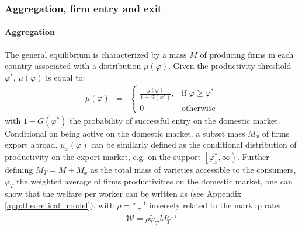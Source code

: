 \documentclass[a4paper,11pt]{article}
\begin{document}
\subsubsection{Aggregation, firm entry and exit}

\paragraph{Aggregation} The general equilibrium is characterized by a mass $M$ of producing firms in each country associated with a distribution $\mu(\varphi)$. Given the productivity threshold $\varphi^\ast$, $\mu(\varphi)$ is equal to:
\begin{eqnarray}
\mu(\varphi) &=& \left\{
\begin{array}{ll}
\frac{g(\varphi)}{1-G(\varphi^\ast)}, & \text{if } \varphi\geq \varphi^\ast  \\
0 & \text{otherwise}
\end{array}
\right.  \label{eq:muofphi}
\end{eqnarray}
\noindent with $1-G(\varphi^\ast)$ the probability of successful entry on the domestic market. Conditional on being active on the domestic market, a subset mass $M_x$ of firms export abroad. $\mu_x(\varphi)$ can be similarly defined as the conditional distribution of productivity on the export market, e.g. on the support $\left[ \varphi^\ast_x,\infty\right)$.
Further defining $M_T = M+M_x$ as the total mass of varieties accessible to the consumers, $\widetilde{\varphi}_T$ the weighted average of firms productivities on the domestic market, one can show that the welfare per worker can be written as (see Appendix \ref{app:theoretical_model}), with $\rho =  \frac{\sigma-1}{\sigma}$ inversely related to the markup rate:
\begin{equation}
\mathcal{W} = \rho \widetilde{\varphi}_T M_T^{\frac{1}{\sigma-1}} \label{eq:Welfare}
\end{equation}
\end{document}
